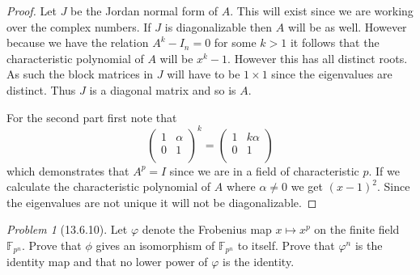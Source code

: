 \documentclass[10pt]{article}
\newcommand{\sk}{\vskip 10mm}
\newcommand{\bb}[1]{\mathbb{#1}}
\theoremstyle{remark}
\newtheorem{problem}{Problem}
\theoremstyle{remark}
\begin{document}
\begin{proof}
  Let $J$ be the Jordan normal form of $A$. This will exist since
  we are working over the complex numbers. If $J$ is diagonalizable
  then $A$ will be as well. However because we have the relation
  $A^k-I_n=0$ for some $k>1$ it follows that the characteristic polynomial
  of $A$ will be $x^k-1$. However this has all distinct roots. As such
  the block matrices in $J$ will have to be $1\times 1$ since the eigenvalues
  are distinct. Thus $J$ is a diagonal matrix and so is $A$.

  \sk
  
  For the second part first note that
  \[
    \left(
      \begin{array}{cc}
        1&\alpha\\
        0&1\\
      \end{array}
    \right)^k
    =
    \left(
      \begin{array}{cc}
        1&k\alpha\\
        0&1\\
      \end{array}
    \right)
  \]
  which demonstrates that $A^p=I$ since we are in a field of characteristic
  $p$. If we calculate the characteristic polynomial of $A$ where $\alpha\neq 0$
  we get $(x-1)^2$. Since the eigenvalues are not unique it will not be
  diagonalizable.
\end{proof}

\sk

\begin{problem}[13.6.10]
  Let $\varphi$ denote the Frobenius map $x\mapsto x^p$ on the finite field
  $\bb{F}_{p^n}$. Prove that $\phi$ gives an isomorphism of $\bb{F}_{p^n}$
  to itself. Prove that $\varphi^n$ is the identity map and that no
  lower power of $\varphi$ is the identity.
\end{problem}
\end{document}
